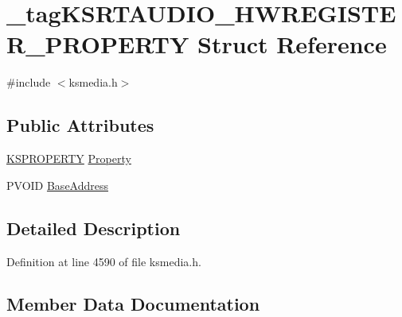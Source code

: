\hypertarget{struct__tag_k_s_r_t_a_u_d_i_o___h_w_r_e_g_i_s_t_e_r___p_r_o_p_e_r_t_y}{}\section{\+\_\+tag\+K\+S\+R\+T\+A\+U\+D\+I\+O\+\_\+\+H\+W\+R\+E\+G\+I\+S\+T\+E\+R\+\_\+\+P\+R\+O\+P\+E\+R\+TY Struct Reference}
\label{struct__tag_k_s_r_t_a_u_d_i_o___h_w_r_e_g_i_s_t_e_r___p_r_o_p_e_r_t_y}


{\ttfamily \#include $<$ksmedia.\+h$>$}

\subsection*{Public Attributes}
\begin{DoxyCompactItemize}
\item 
\hyperlink{ks_8h_a4392f77c74e868d813d46c39ada4d660}{K\+S\+P\+R\+O\+P\+E\+R\+TY} \hyperlink{struct__tag_k_s_r_t_a_u_d_i_o___h_w_r_e_g_i_s_t_e_r___p_r_o_p_e_r_t_y_af134b9234979a3547f1e6609991546ad}{Property}
\item 
P\+V\+O\+ID \hyperlink{struct__tag_k_s_r_t_a_u_d_i_o___h_w_r_e_g_i_s_t_e_r___p_r_o_p_e_r_t_y_a081ac2f01b0a458e5e0de4c68d1946d8}{Base\+Address}
\end{DoxyCompactItemize}


\subsection{Detailed Description}


Definition at line 4590 of file ksmedia.\+h.



\subsection{Member Data Documentation}
